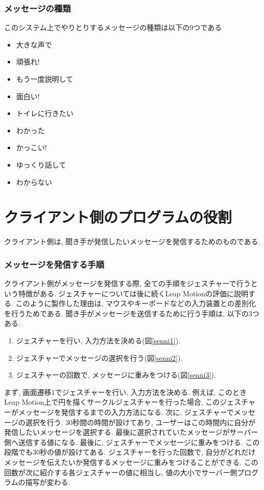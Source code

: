 \documentclass{funthesis}
\begin{document}
\subsubsection{メッセージの種類}
このシステム上でやりとりするメッセージの種類は以下の9つである
\begin{itemize}
 \item 大きな声で
 \item 頑張れ!
 \item もう一度説明して
 \item 面白い!
 \item トイレに行きたい
 \item わかった
 \item かっこい!
  \item ゆっくり話して
 \item わからない
\end{itemize}


\section{クライアント側のプログラムの役割}
クライアント側は, 聞き手が発信したいメッセージを発信するためのものである. 

\subsubsection{メッセージを発信する手順}

クライアント側がメッセージを発信する際, 全ての手順をジェスチャーで行うという特徴がある. ジェスチャーについては後に続くLeap Motionの評価に説明する. このように製作した理由は, マウスやキーボードなどの入力装置との差別化を行うためである. 聞き手がメッセージを送信するために行う手順は, 以下の3つある. 
\begin{enumerate}
 \item ジェスチャーを行い, 入力方法を決める(図\ref{senni1}). 
 \item ジェスチャーでメッセージの選択を行う(図\ref{senni2}). 
 \item ジェスチャーの回数で, メッセージに重みをつける(図\ref{senni3}). 
\end{enumerate}

まず, 画面遷移1でジェスチャーを行い, 入力方法を決める. 例えば, このときLeap Motion上で円を描くサークルジェスチャーを行った場合, このジェスチャーがメッセージを発信するまでの入力方法になる. 
次に, ジェスチャーでメッセージの選択を行う. 30秒間の時間が設けてあり, ユーザーはこの時間内に自分が発信したいメッセージを選択する. 最後に選択されていたメッセージがサーバー側へ送信する値になる. %
最後に, ジェスチャーでメッセージに重みをつける. この段階でも30秒の値が設けてある. ジェスチャーを行った回数で, 自分がどれだけメッセージを伝えたいか発信するメッセージに重みをつけることができる. この回数が次に紹介する各ジェスチャーの値に相当し, 値の大小でサーバー側プログラムの描写が変わる. 
\end{document}
